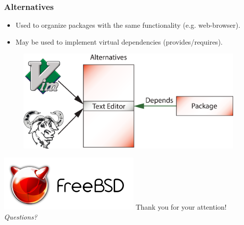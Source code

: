 \documentclass{beamer}
\begin{document}
\begin{frame}
\frametitle{Alternatives}
\begin{itemize}
  \item Used to organize packages with the same functionality (e.g.
  web-browser).
  \item May be used to implement virtual dependencies (provides/requires).
\end{itemize}
\begin{figure}[h!]
  \centering
  \includegraphics[height=0.4\textheight]{q7.eps}
\end{figure}
\end{frame}

\begin{frame}
\begin{center}
\includegraphics{logo.pdf}
{\Large Thank you for your attention!} \\
\emph{Questions?}
\end{center}
\end{frame}
\end{document}
